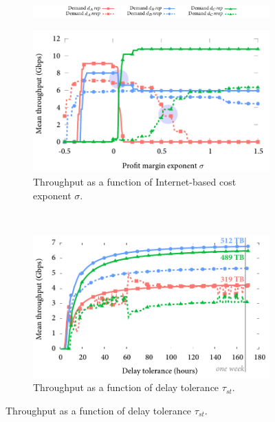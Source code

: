 \begin{figure}[!t]
    \centering
    \begin{subfigure}[b]{0.8\textwidth}
        \centering
        \includegraphics[width=\textwidth]{results/legend.pdf}
    \end{subfigure}%

    \begin{subfigure}[b]{0.50\textwidth}
        \centering
        \includegraphics[width=\textwidth]{results/beta-ton.pdf}
        \caption{Throughput as a function of Internet-based cost exponent $\sigma$.}
        \label{fig:ton-beta}
    \end{subfigure}%
    ~ %
    \begin{subfigure}[b]{0.50\textwidth}
        \centering
        \includegraphics[width=\textwidth]{results/delayTolerance-ton.pdf}
        \caption{Throughput as a function of delay tolerance $\tau_{st}$.}
        \label{fig:ton-delayTolerance}
    \end{subfigure}
    

\end{figure}
